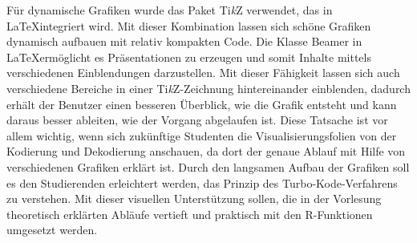 Für dynamische Grafiken wurde das Paket Ti\textit{k}Z verwendet, das in \LaTeX integriert wird. Mit dieser Kombination lassen sich schöne Grafiken dynamisch aufbauen mit relativ kompakten Code. Die Klasse Beamer in \LaTeX ermöglicht es Präsentationen zu erzeugen und somit Inhalte mittels verschiedenen Einblendungen darzustellen. Mit dieser Fähigkeit lassen sich auch verschiedene Bereiche in einer Ti\textit{k}Z-Zeichnung hintereinander einblenden, dadurch erhält der Benutzer einen besseren Überblick, wie die Grafik entsteht und kann daraus besser ableiten, wie der Vorgang abgelaufen ist. Diese Tatsache ist vor allem wichtig, wenn sich zukünftige Studenten die Visualisierungsfolien von der Kodierung und Dekodierung anschauen, da dort der genaue Ablauf mit Hilfe von verschiedenen Grafiken erklärt ist. Durch den langsamen Aufbau der Grafiken soll es den Studierenden erleichtert werden, das Prinzip des Turbo-Kode-Verfahrens zu verstehen. Mit dieser visuellen Unterstützung sollen, die in der Vorlesung theoretisch erklärten Abläufe vertieft und praktisch mit den R-Funktionen umgesetzt werden.  